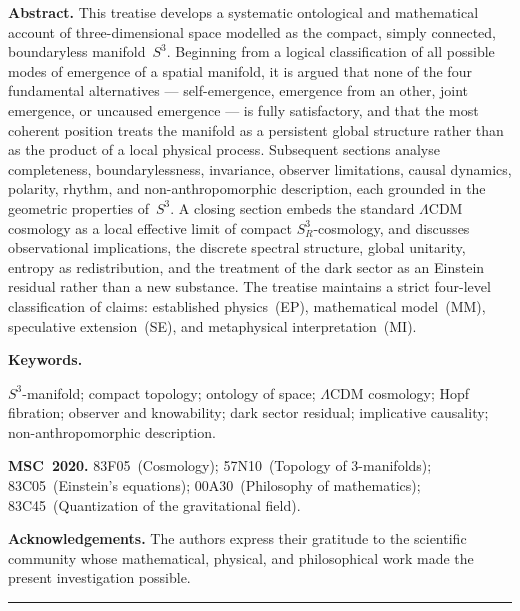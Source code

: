 \documentclass[12pt,a4paper]{article}
\theoremstyle{definition}
\begin{document}
\begin{tcolorbox}[abstractbox]
\textbf{Abstract.}\enspace
This treatise develops a systematic ontological and mathematical account of
three-dimensional space modelled as the compact, simply connected, boundaryless
manifold~$S^3$.
Beginning from a logical classification of all possible modes of emergence of a
spatial manifold, it is argued that none of the four fundamental
alternatives — self-emergence, emergence from an other, joint emergence, or
uncaused emergence — is fully satisfactory, and that the most coherent position
treats the manifold as a persistent global structure rather than as the product
of a local physical process.
Subsequent sections analyse completeness, boundarylessness, invariance, observer
limitations, causal dynamics, polarity, rhythm, and non-anthropomorphic
description, each grounded in the geometric properties of~$S^3$.
A closing section embeds the standard $\Lambda$CDM cosmology as a local
effective limit of compact $S^3_R$-cosmology, and discusses observational
implications, the discrete spectral structure, global unitarity, entropy as
redistribution, and the treatment of the dark sector as an Einstein residual
rather than a new substance.
The treatise maintains a strict four-level classification of claims:
established physics~(EP), mathematical model~(MM), speculative
extension~(SE), and metaphysical interpretation~(MI).
\end{tcolorbox}

\medskip\noindent
\textbf{Keywords.}\enspace
\begin{minipage}[t]{\dimexpr\linewidth-6.2em}
\raggedright
$S^3$-manifold; compact topology; ontology of space;
$\Lambda$CDM cosmology; Hopf fibration; observer and knowability;
dark sector residual; implicative causality; non-anthropomorphic description.
\end{minipage}

\medskip\noindent
\textbf{MSC~2020.}\enspace
83F05~(Cosmology);\enspace
57N10~(Topology of 3-manifolds);\enspace
83C05~(Einstein's equations);\enspace
00A30~(Philosophy of mathematics);\enspace
83C45~(Quantization of the gravitational field).

\medskip\noindent
\textbf{Acknowledgements.}\enspace
The authors express their gratitude to the scientific community whose
mathematical, physical, and philosophical work made the present investigation
possible.

\vspace{0.6em}
\noindent\rule{\linewidth}{0.3pt}
\end{document}
